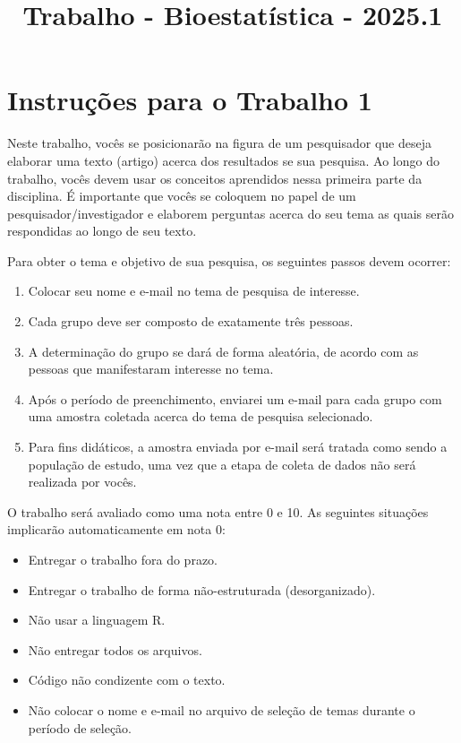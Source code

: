 \documentclass{article}
\title{Trabalho - Bioestatística - 2025.1}
\begin{document}
\date{}
\maketitle

\section{Instruções para o Trabalho 1}

Neste trabalho, vocês se posicionarão na figura de um pesquisador que deseja elaborar uma texto (artigo) acerca dos resultados se sua pesquisa.
Ao longo do trabalho, vocês devem usar os conceitos aprendidos nessa primeira parte da disciplina. É importante que vocês se coloquem 
no papel de um pesquisador/investigador e elaborem perguntas acerca do seu tema as quais serão respondidas ao longo de seu texto. 

Para obter o tema e objetivo de sua pesquisa, os seguintes passos devem ocorrer:
\begin{enumerate}
    \item Colocar seu nome e e-mail no tema de pesquisa de interesse. 
    \item Cada grupo deve ser composto de exatamente três pessoas. 
    \item A determinação do grupo se dará de forma aleatória, de acordo com as pessoas que manifestaram interesse no tema. 
    \item Após o período de preenchimento, enviarei um e-mail para cada grupo com uma amostra coletada acerca do tema de pesquisa selecionado. 
    \item Para fins didáticos, a amostra enviada por e-mail será tratada como sendo a população de estudo, uma vez que a etapa de coleta de dados não será realizada por vocês.
\end{enumerate}

O trabalho será avaliado como uma nota entre 0 e 10. As seguintes situações implicarão automaticamente em nota 0:

\begin{itemize}
    \item Entregar o trabalho fora do prazo. 
    \item Entregar o trabalho de forma não-estruturada (desorganizado). 
    \item Não usar a linguagem R.
    \item Não entregar todos os arquivos.
    \item Código não condizente com o texto. 
    \item Não colocar o nome e e-mail no arquivo de seleção de temas durante o período de seleção. 
\end{itemize}
\end{document}

